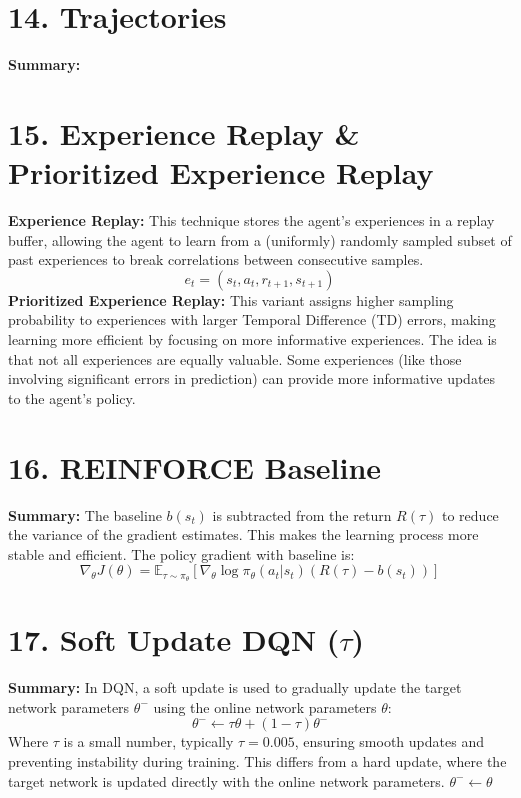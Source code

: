 \documentclass[a4paper,10pt]{article}
\begin{document}
\begin{multicols}{2}
\section*{14. Trajectories}
\textbf{Summary:} 

\section*{15. Experience Replay \& Prioritized Experience Replay}
\textbf{Experience Replay:} This technique stores the agent's experiences in a replay buffer, allowing the agent to learn from a (uniformly) randomly sampled subset of past experiences to break correlations between consecutive samples.
\[
e_t = (s_t, a_t, r_{t+1}, s_{t+1})
\]
\textbf{Prioritized Experience Replay:} This variant assigns higher sampling probability to experiences with larger Temporal Difference (TD) errors, making learning more efficient by focusing on more informative experiences. The idea is that not all experiences are equally valuable. Some experiences (like those involving significant errors in prediction) can provide more informative updates to the agent's policy.

\section*{16. REINFORCE Baseline}
\textbf{Summary:} The baseline \( b(s_t) \) is subtracted from the return \( R(\tau) \) to reduce the variance of the gradient estimates. This makes the learning process more stable and efficient. The policy gradient with baseline is:
\[
\nabla_\theta J(\theta) = \mathbb{E}_{\tau \sim \pi_\theta} \left[ \nabla_\theta \log \pi_\theta(a_t | s_t) (R(\tau) - b(s_t)) \right]
\]

\section*{17. Soft Update DQN (\(\tau\))}
\textbf{Summary:} In DQN, a soft update is used to gradually update the target network parameters \( \theta^- \) using the online network parameters \( \theta \):
\[
\theta^- \leftarrow \tau \theta + (1 - \tau) \theta^-
\]
Where \( \tau \) is a small number, typically \( \tau = 0.005 \), ensuring smooth updates and preventing instability during training. This differs from a hard update, where the target network is updated directly with the online network parameters. \( \theta^- \leftarrow \theta \)


\end{multicols}
\end{document}
